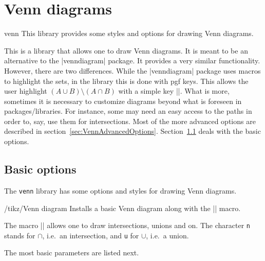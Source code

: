 \documentclass[a4paper]{ltxdoc}
\begin{document}
\section{Venn diagrams}
\begin{tikzlibrary}{venn}
    This library provides some styles and options for drawing Venn diagrams.
\end{tikzlibrary}

This is a library that allows one to draw Venn diagrams. It is meant to be an
alternative to the |venndiagram| package. It provides a very similar
functionality. However, there are two differences. While the |venndiagram|
package uses macros to highlight the sets, in the library this is done with pgf
keys. This allows the user highlight $(A\cup B)\setminus(A\cap B)$ with a simple
key ||. What is more, sometimes it is necessary to
customize diagrams beyond what is foreseen in packages/libraries. For instance,
some may need an easy access to the paths in order to, say, use them for
intersections. Most of the more advanced options are described in
section~\ref{sec:VennAdvancedOptions}. Section~\ref{sec:VennBasicOptions} deals
with the basic options.

\subsection{Basic options}
\label{sec:VennBasicOptions}

The \texttt{venn} library has some options and styles for drawing Venn diagrams.
\begin{key}{/tikz/Venn diagram}
        Installs a basic Venn diagram along with the |\Venn| macro.
\end{key}

The macro |\Venn| allows one to draw intersections, unions and on. The character
\texttt{n} stands for $\cap$, i.e.\ an intersection, and \texttt{u} for $\cup$,
i.e.\ a union.

\begin{codeexample}[width=5cm]
\end{codeexample}

The most basic parameters are listed next.
\end{document}
